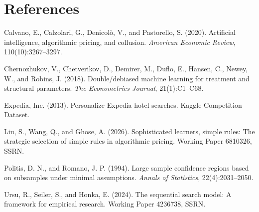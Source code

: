 \documentclass[11pt]{article}
\begin{document}
\clearpage
\section*{References}

\begin{description}\itemsep4pt
\item Calvano, E., Calzolari, G., Denicol\`o, V., and Pastorello, S. (2020).
      Artificial intelligence, algorithmic pricing, and collusion.
      \emph{American Economic Review}, 110(10):3267--3297.
\item Chernozhukov, V., Chetverikov, D., Demirer, M., Duflo, E., Hansen, C.,
      Newey, W., and Robins, J. (2018). Double/debiased machine learning for
      treatment and structural parameters. \emph{The Econometrics Journal},
      21(1):C1--C68.
\item Expedia, Inc. (2013). Personalize Expedia hotel searches. Kaggle
      Competition Dataset.
\item Liu, S., Wang, Q., and Ghose, A. (2026). Sophisticated learners, simple
      rules: The strategic selection of simple rules in algorithmic pricing.
      Working Paper 6810326, SSRN.
\item Politis, D. N., and Romano, J. P. (1994). Large sample confidence regions
      based on subsamples under minimal assumptions. \emph{Annals of
      Statistics}, 22(4):2031--2050.
\item Ursu, R., Seiler, S., and Honka, E. (2024). The sequential search model:
      A framework for empirical research. Working Paper 4236738, SSRN.
\end{description}
\end{document}
